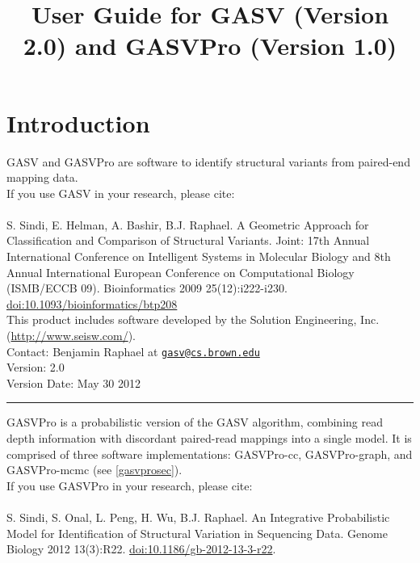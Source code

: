 \documentclass[11pt]{article}
\title{User Guide for GASV (Version 2.0) and GASVPro (Version 1.0)}
\date{}                                           %
\newcommand{\sectionline}{
  \nointerlineskip \vspace{\baselineskip}
  \hspace{\fill}\rule{0.3\linewidth}{.7pt}\hspace{\fill}
  \par\nointerlineskip \vspace{\baselineskip}
}
\begin{document}

\maketitle

\tableofcontents
\clearpage

\section{Introduction}

GASV and GASVPro are software to identify structural variants from paired-end mapping data. \\

\noindent If you use GASV in your research, please cite: \\ \\
S. Sindi, E. Helman, A. Bashir, B.J. Raphael. A Geometric Approach for
Classification and Comparison of Structural Variants. Joint: 17th
Annual International Conference on Intelligent Systems in Molecular
Biology and 8th Annual International European Conference on
Computational Biology (ISMB/ECCB 09).  Bioinformatics 2009
25(12):i222-i230. \href{http://dx.doi.org/10.1093/bioinformatics/btp208}{doi:10.1093/bioinformatics/btp208}\\

\noindent This product includes software developed by the Solution Engineering,
Inc. (\url{http://www.seisw.com/}).\\

\noindent Contact: Benjamin Raphael at \href{mailto:gasv@cs.brown.edu}{\nolinkurl{gasv@cs.brown.edu}}\\

\noindent Version: 2.0 \\
\noindent Version Date: May 30 2012 

\sectionline

\noindent GASVPro is a probabilistic version of the GASV algorithm, combining read depth information with discordant paired-read mappings into a single model. It is comprised of three software implementations: GASVPro-cc, GASVPro-graph, and GASVPro-mcmc (see \ref{gasvprosec}). \\

\noindent If you use GASVPro in your research, please cite: \\ \\ 
S. Sindi, S. Onal, L. Peng, H. Wu, B.J. Raphael. An Integrative Probabilistic Model for Identification of Structural Variation in Sequencing Data. Genome Biology 2012 13(3):R22. \href{http://dx.doi.org/10.1186/gb-2012-13-3-r22}{doi:10.1186/gb-2012-13-3-r22}.\\
\end{document}
